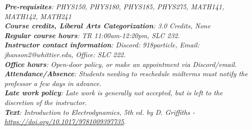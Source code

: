 \documentclass[10pt]{article}
\begin{document}
\maketitle


\begin{abstract}
This course provides a rigorous exploration of classical electrodynamics, including new computational electromagnetism (CEM) content.  The course begins with a review of vector calculus and its physical interpretation in electromagnetism.  Next, the electrostatics of charge distributions using Coulomb's law, Gauss's law, and the electric potential will be presented. The course proceeds to boundary-value problems and solutions to Laplace's equation, including multipole expansions and the method of images.  Building on the introductory content, the course procedes to properties and behavior of electric fields in matter, covering polarization, bound charges, and the electric displacement field.  From electrostatics, the course proceeds to magnetostatics, introducing the Biot–Savart law, Amp\`{e}re's law, vector potential, and the role of magnetization in materials.  New CEM content serves as an introduction to time-dependent electromagnetic fields.  Throughout the course, emphasis is placed on analytical problem-solving through active learning strategies.  Final projects allow students to creatively explore scientific and engineering applications of electrodynamics and CEM.
\end{abstract}
\noindent
\textit{\textbf{Pre-requisites}: PHYS150, PHYS180, PHYS185, PHYS275, MATH141, MATH142, MATH241} \\
\textit{\textbf{Course credits, Liberal Arts Categorization}: 3.0 Credits, None} \\
\textit{\textbf{Regular course hours}: TR 11:00am-12:20pm, SLC 232.} \\
\textit{\textbf{Instructor contact information}: Discord: 918particle, Email: jhanson2@whittier.edu, Office: SLC 222.} \\
\textit{\textbf{Office hours}: Open-door policy, or make an appointment via Discord/email.} \\
\textit{\textbf{Attendance/Absence}: Students needing to reschedule midterms must notify the professor a few days in advance.} \\ 
\textit{\textbf{Late work policy}: Late work is generally not accepted, but is left to the discretion of the instructor.} \\
\textit{\textbf{Text}: Introduction to Electrodynamics, 5th ed. by D. Griffiths - \url{
https://doi.org/10.1017/9781009397735}}. \\
\end{document}
